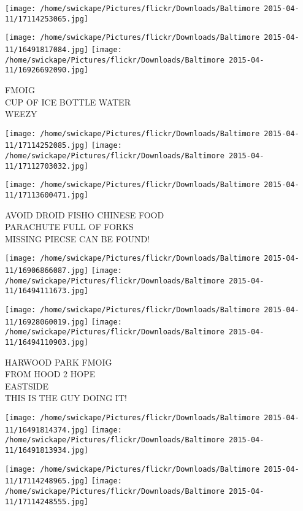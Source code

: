 \documentclass[10pt,letterpaper]{article}
\begin{document}
\texttt{[image: /home/swickape/Pictures/flickr/Downloads/Baltimore 2015-04-11/17114253065.jpg]}

\vspace{0.25in}
\texttt{[image: /home/swickape/Pictures/flickr/Downloads/Baltimore 2015-04-11/16491817084.jpg]}
\texttt{[image: /home/swickape/Pictures/flickr/Downloads/Baltimore 2015-04-11/16926692090.jpg]}

FMOIG\\
CUP OF ICE BOTTLE WATER\\
WEEZY
\pagebreak

\texttt{[image: /home/swickape/Pictures/flickr/Downloads/Baltimore 2015-04-11/17114252085.jpg]}
\texttt{[image: /home/swickape/Pictures/flickr/Downloads/Baltimore 2015-04-11/17112703032.jpg]}

\vspace{0.25in}
\texttt{[image: /home/swickape/Pictures/flickr/Downloads/Baltimore 2015-04-11/17113600471.jpg]}

AVOID DROID FISHO CHINESE FOOD\\
PARACHUTE FULL OF FORKS\\
MISSING PIECSE CAN BE FOUND!
\pagebreak

\texttt{[image: /home/swickape/Pictures/flickr/Downloads/Baltimore 2015-04-11/16906866087.jpg]}
\texttt{[image: /home/swickape/Pictures/flickr/Downloads/Baltimore 2015-04-11/16494111673.jpg]}

\texttt{[image: /home/swickape/Pictures/flickr/Downloads/Baltimore 2015-04-11/16928060019.jpg]}
\texttt{[image: /home/swickape/Pictures/flickr/Downloads/Baltimore 2015-04-11/16494110903.jpg]}

HARWOOD PARK FMOIG\\
FROM HOOD 2 HOPE\\
EASTSIDE\\
THIS IS THE GUY DOING IT!
\pagebreak

\texttt{[image: /home/swickape/Pictures/flickr/Downloads/Baltimore 2015-04-11/16491814374.jpg]}
\texttt{[image: /home/swickape/Pictures/flickr/Downloads/Baltimore 2015-04-11/16491813934.jpg]}

\texttt{[image: /home/swickape/Pictures/flickr/Downloads/Baltimore 2015-04-11/17114248965.jpg]}
\texttt{[image: /home/swickape/Pictures/flickr/Downloads/Baltimore 2015-04-11/17114248555.jpg]}
\end{document}
